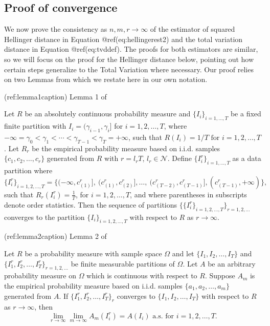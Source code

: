 \documentclass{article}
\begin{document}
\hypertarget{proof-of-convergence}{%
\subsection{Proof of convergence}\label{proof-of-convergence}}

We now prove the consistency as \(n,m,r\rightarrow\infty\) of the
estimator of squared Hellinger distance in Equation
@ref(eq:hellingerest2) and the total variation distance in Equation
@ref(eq:tvddef). The proofs for both estimators are similar, so we will
focus on the proof for the Hellinger distance below, pointing out how
certain steps generalize to the Total Variation where necessary. Our
proof relies on two Lemmas from \citet{Wang2005-zs} which we restate
here in our own notation.

(ref:lemma1caption) Lemma 1 of \citep{Wang2005-zs}

\leavevmode{}%
Let \(R\) be an absolutely continuous probability measure and
\(\{I_i\}_{i=1,\dots,T}\) be a fixed finite partition with
\(I_i = (\gamma_{i-1}, \gamma_i]\) for \(i=1,2,\dots,T\), where
\(-\infty=\gamma_0 < \gamma_1 < \cdots < \gamma_{T-1} < \gamma_T=+\infty\),
such that \(R(I_i)=1/T \text{ for } i=1,2,\dots,T\). Let \(R_r\) be the
empirical probability measure based on i.i.d. samples
\(\{c_1, c_2,\dots, c_r\}\) generated from \(R\) with \(r=l_rT\),
\(l_r\in\mathcal{N}\). Define \(\{I_i^r\}_{i=1,\dots,T}\) as a data
partition where \begin{equation}\label{eq:empsegments}
\{I_i^r \}_{i=1,2,\dots,T} = \{ (-\infty, c_{(1)}^r], \ (c_{(1)}^r, c_{(2)}^r], \dots, \ (c_{(T-2)}^r,c_{(T-1)}^r], (c_{(T-1)}^r, +\infty ) \},
\end{equation} such that \(R_r(I_i^r)=\frac{1}{T}\), for
\(i=1,2,\dots,T\), and where parentheses in subscripts denote order
statistics. Then the sequence of partitions
\(\{\{I_i^r \}_{i=1,2,\dots,T}\}_{r=1,2,\dots}\) converges to the
partition \(\{I_i \}_{i=1,2,\dots,T}\) with respect to \(R\) as
\(r\rightarrow \infty\).

(ref:lemma2caption) Lemma 2 of \citep{Wang2005-zs}

\leavevmode{}%
Let \(R\) be a probability measure with sample space \(\Omega\) and let
\(\{I_1, I_2, \dots, I_T\}\) and
\(\{I_1^r, I_2^r, \dots, I_T^r\}_{r=1,2,\dots}\) be finite measurable
partitions of \(\Omega\). Let \(A\) be an arbitrary probability measure
on \(\Omega\) which is continuous with respect to \(R\). Suppose \(A_m\)
is the empirical probability measure based on i.i.d. samples
\(\{a_1, a_2, \dots, a_m\}\) generated from \(A\). If
\(\{I_1^r, I_2^r, \dots, I_T^r\}_{r}\) converges to
\(\{I_1, I_2, \dots, I_T\}\) with respect to \(R\) as
\(r \rightarrow \infty\), then \begin{equation}
  \lim_{r \rightarrow \infty}\lim_{m \rightarrow \infty} A_m(I_i^r) = A(I_i) \text{ a.s. for } i=1,2,\dots,T.
\end{equation}
\end{document}
